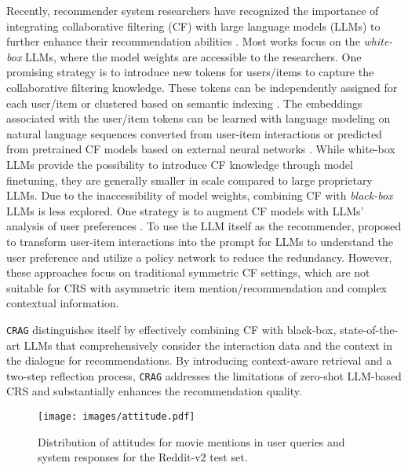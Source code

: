 Recently, recommender system researchers have recognized the importance of integrating collaborative filtering (CF) with large language models (LLMs) to further enhance their recommendation abilities \citep{wu2024survey}. Most works focus on the \textit{white-box} LLMs, where the model weights are accessible to the researchers. One promising strategy is to introduce new tokens for users/items to capture the collaborative filtering knowledge. These tokens can be independently assigned for each user/item \citep{zhu2024collaborative,bao2023tallrec} or clustered based on semantic indexing \citep{hua2023index}. The embeddings associated with the user/item tokens can be learned with language modeling on natural language sequences converted from user-item interactions \citep{zhu2024collaborative} or predicted from pretrained CF models based on external neural networks \citep{kim2024large, zheng2024adapting}. While white-box LLMs provide the possibility to introduce CF knowledge through model finetuning, they are generally smaller in scale compared to large proprietary LLMs. Due to the inaccessibility of model weights, combining CF with \textit{black-box} LLMs is less explored. One strategy is to augment CF models with LLMs' analysis of user preferences \citep{ren2024representation,wei2024llmrec,xi2024towards}. To use the LLM itself as the recommender, \citet{wu2024coral} proposed to transform user-item interactions into the prompt for LLMs to understand the user preference and utilize a policy network to reduce the redundancy. However, these approaches focus on traditional symmetric CF settings, which are not suitable for CRS with asymmetric item mention/recommendation and complex contextual information.

\texttt{CRAG} distinguishes itself by effectively combining CF with black-box, state-of-the-art LLMs that comprehensively consider the interaction data and the context in the dialogue for recommendations. By introducing context-aware retrieval and a two-step reflection process, \texttt{CRAG} addresses the limitations of zero-shot LLM-based CRS and substantially enhances the recommendation quality.

\begin{figure}[t]
\centering
\texttt{[image: images/attitude.pdf]} 
\vspace{-3mm}    
\caption{Distribution of attitudes for movie mentions in user queries and system responses for the Reddit-v2 test set.} 
\vspace{-5mm}   
\label{fig:attitude}
\end{figure}